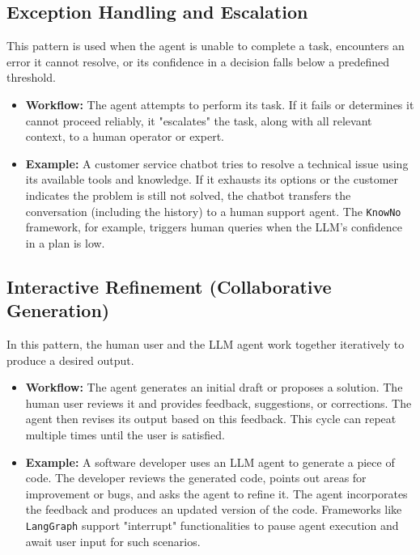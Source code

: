 \subsection*{Exception Handling and Escalation}
This pattern is used when the agent is unable to complete a task, encounters an error it cannot resolve, or its confidence in a
 decision falls below a predefined threshold.
\begin{itemize}
    \item \textbf{Workflow:} The agent attempts to perform its task. If it fails or determines it cannot proceed reliably, 
    it "escalates" the task, along with all relevant context, to a human operator or expert.
    \item \textbf{Example:} A customer service chatbot tries to resolve a technical issue using its available tools and knowledge. 
    If it exhausts its options or the customer indicates the problem is still not solved, the chatbot transfers the conversation 
    (including the history) to a human support agent. The \texttt{KnowNo} framework, for example, triggers human queries when
     the LLM's confidence in a plan is low.
\end{itemize}

\subsection*{Interactive Refinement (Collaborative Generation)}
In this pattern, the human user and the LLM agent work together iteratively to produce a desired output.
\begin{itemize}
    \item \textbf{Workflow:} The agent generates an initial draft or proposes a solution. The human user reviews it and provides
     feedback, suggestions, or corrections. The agent then revises its output based on this feedback. This cycle can repeat multiple 
     times until the user is satisfied.
    \item \textbf{Example:} A software developer uses an LLM agent to generate a piece of code. The developer reviews the generated code, 
    points out areas for improvement or bugs, and asks the agent to refine it. The agent incorporates the feedback and produces an updated
     version of the code. Frameworks like \texttt{LangGraph} support "interrupt" functionalities to pause agent execution and await user
      input for such scenarios.
\end{itemize}

